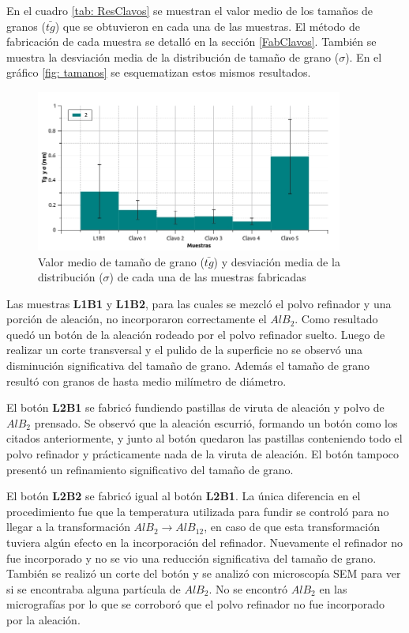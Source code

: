 \documentclass[a4paper,12pt,fleqn,twoside,openany]{book}
\begin{document}
En el cuadro \ref{tab: ResClavos} se muestran el valor medio de los tamaños de granos ($\bar{tg}$) que se obtuvieron en cada una de las muestras. El método de fabricación de cada muestra se detalló en la sección \ref{FabClavos}. También se muestra la desviación media de la distribución de tamaño de grano ($\sigma$). En el gráfico \ref{fig: tamanos} se esquematizan estos mismos resultados.

 \begin{figure}[h]
 \centering
 \includegraphics[width=0.9\textwidth]{Img/Resultados/clavos/TamGranos.jpg}
 \caption{Valor medio de tamaño de grano ($\bar{tg}$) y desviación media de la distribución ($\sigma$) de cada una de las muestras fabricadas} 
 \label{fig:tamanos}
 \end{figure}

Las muestras \textbf{ L1B1} y \textbf{L1B2}, para las cuales se mezcló el polvo refinador y una porción de aleación, no incorporaron correctamente el $AlB_2$. Como resultado quedó un botón de la aleación rodeado por el polvo refinador suelto. Luego de realizar un corte transversal y el pulido de la superficie no se observó una disminución significativa del tamaño de grano. Además el tamaño de grano resultó con granos de hasta medio milímetro de diámetro.  

El botón \textbf{L2B1} se fabricó fundiendo pastillas de viruta de aleación y polvo de $AlB_2$ prensado. Se observó que la aleación escurrió, formando un botón como los citados anteriormente, y junto al botón quedaron las pastillas conteniendo todo el polvo refinador y prácticamente nada de la viruta de aleación. El botón tampoco presentó un refinamiento significativo del tamaño de grano.

El botón \textbf{L2B2} se fabricó igual al botón \textbf{L2B1}. La única diferencia en el procedimiento fue que la temperatura utilizada para fundir se controló para no llegar a la transformación $AlB_2 \rightarrow AlB_{12}$, en caso de que esta transformación tuviera algún efecto en la incorporación del refinador. Nuevamente el refinador no fue incorporado y no se vio una reducción significativa del tamaño de grano. También se realizó un corte del botón y se analizó con microscopía SEM para ver si se encontraba alguna partícula de $AlB_2$. No se encontró $AlB_2$ en las micrografías por lo que se corroboró que el polvo refinador no fue incorporado por la aleación.
\end{document}
